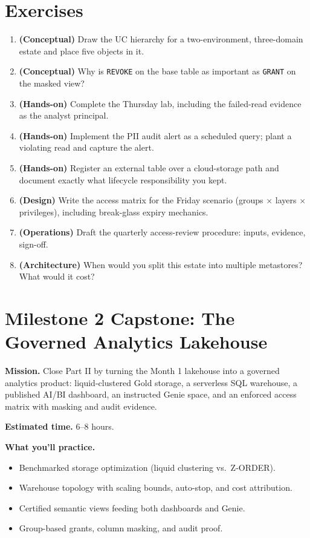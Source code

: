 \section{Exercises}
\begin{enumerate}
    \item \textbf{(Conceptual)} Draw the UC hierarchy for a two-environment, three-domain estate and place five objects in it.
    \item \textbf{(Conceptual)} Why is \texttt{REVOKE} on the base table as important as \texttt{GRANT} on the masked view?
    \item \textbf{(Hands-on)} Complete the Thursday lab, including the failed-read evidence as the analyst principal.
    \item \textbf{(Hands-on)} Implement the PII audit alert as a scheduled query; plant a violating read and capture the alert.
    \item \textbf{(Hands-on)} Register an external table over a cloud-storage path and document exactly what lifecycle responsibility you kept.
    \item \textbf{(Design)} Write the access matrix for the Friday scenario (groups $\times$ layers $\times$ privileges), including break-glass expiry mechanics.
    \item \textbf{(Operations)} Draft the quarterly access-review procedure: inputs, evidence, sign-off.
    \item \textbf{(Architecture)} When would you split this estate into multiple metastores? What would it cost?
\end{enumerate}

\section{Milestone 2 Capstone: The Governed Analytics Lakehouse}\label{sec:ch8-capstone}

\begin{capstonebox}
\textbf{Mission.} Close Part II by turning the Month 1 lakehouse into a governed analytics product: liquid-clustered Gold storage, a serverless SQL warehouse, a published AI/BI dashboard, an instructed Genie space, and an enforced access matrix with masking and audit evidence.

\textbf{Estimated time.} 6--8 hours.

\textbf{What you'll practice.}
\begin{itemize}
    \item Benchmarked storage optimization (liquid clustering vs.\ Z-ORDER).
    \item Warehouse topology with scaling bounds, auto-stop, and cost attribution.
    \item Certified semantic views feeding both dashboards and Genie.
    \item Group-based grants, column masking, and audit proof.
\end{itemize}
\end{capstonebox}

